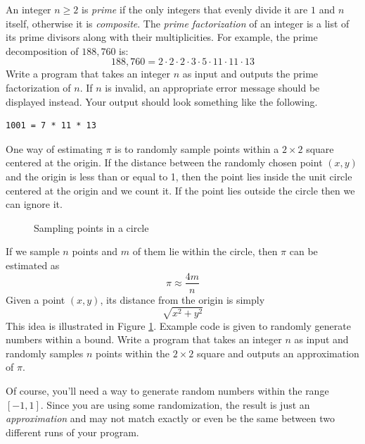 \begin{exer}
An integer $n \geq 2$ is \emph{prime} if the only integers that evenly divide it are $1$ and $n$ itself, 
otherwise it is \emph{composite}.  The \emph{prime factorization} of an integer is a list of its prime divisors 
along with their multiplicities.  For example, the prime decomposition of $188,760$ is:
  $$188,760 = 2 \cdot 2 \cdot 2 \cdot 3 \cdot 5 \cdot 11 \cdot 11 \cdot 13$$
Write a program that takes an integer $n$ as input and outputs the prime factorization of $n$.
If $n$ is invalid, an appropriate error message should be displayed instead.  Your output should look 
something like the following.
\begin{verbatim}
1001 = 7 * 11 * 13
\end{verbatim}
\end{exer}

\begin{exer} 
One way of estimating $\pi$ is to randomly sample points within a $2 \times 2$ square centered
at the origin.  If the distance between the randomly chosen point $(x, y)$ and the origin is less than or
equal to 1, then the point lies inside the unit circle centered at the origin and we count it.  If the 
point lies outside the circle then we can ignore it.  
\begin{figure}[h]
\centering

\caption{Sampling points in a circle}
\label{fig:circleSample}
\end{figure}
If we sample $n$ points and $m$ of them lie within the circle, then $\pi$ can be estimated as
 $$\pi \approx \frac{4m}{n}$$
Given a point $(x, y)$, its distance from the origin is simply
  $$\sqrt{x^2 + y^2}$$
This idea is illustrated in Figure \ref{fig:circleSample}.  Example code is given to randomly generate 
numbers within a bound.  Write a program that takes an integer $n$ as input and 
randomly samples $n$ points within the $2 \times 2$ square and outputs an approximation of $\pi$.

Of course, you'll need a way to generate random numbers within the range $[-1, 1]$.  Since you are
using some randomization, the result is just an \emph{approximation} and may not match exactly or
even be the same between two different runs of your program.
\end{exer}

